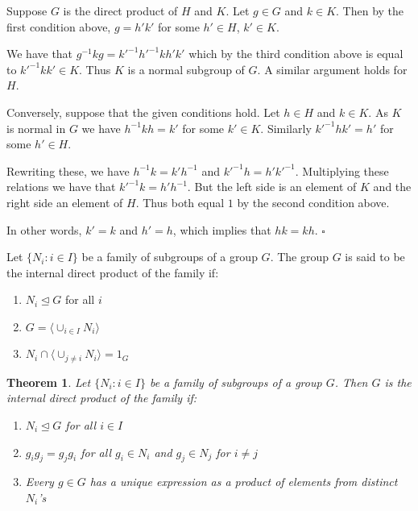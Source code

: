 \documentclass[10pt]{article}
\newtheorem{theorem}{Theorem}[section]
\newenvironment{proof}[1][Proof]{\begin{trivlist}
\item[\hskip \labelsep {\itshape #1}]}{\end{trivlist}}
\newenvironment{definition}[1][Definition]{\begin{trivlist}
\item[\hskip \labelsep {\bfseries #1}]}{\end{trivlist}}
\begin{document}
\begin{proof}
Suppose $G$ is the direct product of $H$ and $K$. Let $g \in G$ and $k \in K$. Then by the first condition above, $g = h'k'$ for some $h' \in H$, $k' \in K$.

We have that $g^{-1}kg = k'^{-1}h'^{-1}kh'k'$ which by the third condition above is equal to $k'^{-1}kk' \in K$. Thus $K$ is a normal subgroup of $G$. A similar argument holds for $H$.

Conversely, suppose that the given conditions hold. Let $h \in H$ and $k \in K$. As $K$ is normal in $G$ we have $h^{-1}kh = k'$ for some $k' \in K$. Similarly $k'^{-1}hk' = h'$ for some $h' \in H$.

Rewriting these, we have $h^{-1}k = k'h^{-1}$ and $k'^{-1}h = h'k'^{-1}$. Multiplying these relations we have that $k'^{-1}k = h'h^{-1}$. But the left side is an element of $K$ and the right side an element of $H$. Thus both equal $1$ by the second condition above.

In other words, $k' = k$ and $h' = h$, which implies that $hk = kh$. $\square$
\end{proof}

\begin{definition}
Let $\{N_i : i \in I\}$ be a family of subgroups of a group $G$. The group $G$ is said to be the internal direct product of the family if:
\begin{enumerate}
\item $N_i \mathrel{\unlhd} G$ for all $i$
\item $G = \langle \cup_{i\in I} N_i \rangle$
\item $N_i \cap \langle \cup_{j \neq i} N_i \rangle = 1_G$
\end{enumerate}
\end{definition}

\begin{theorem}
Let $\{N_i : i \in I\}$ be a family of subgroups of a group $G$. Then $G$ is the internal direct product of the family if:
\begin{enumerate}
\item $N_i \mathrel{\unlhd} G$ for all $i \in I$
\item $g_ig_j = g_jg_i$ for all $g_i \in N_i$ and $g_j \in N_j$ for $i \neq j$
\item Every $g \in G$ has a unique expression as a product of elements from distinct $N_i$'s
\end{enumerate}
\end{theorem}
\end{document}
